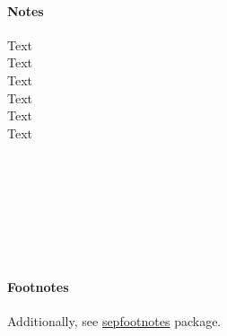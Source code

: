 \documentclass[itdr]{subfiles}
\begin{document}
\paragraph{Notes}
\vspace{-\baselineskip}
\begin{multicols}{2}
\noindent Text\note[1] \\
Text\note[2] \\
Text\note[3] \\
Text\note[4] \\
Text\note[5] \\
Text\note[6] 
\end{multicols}
\footnoterule\noindent
{} \\
 \\
 \\
 \\
 \\
 \\

\vspace{-2ex}
\paragraph{Footnotes}

\fbox{\lstinline!\\footnotemark[1]!} 

\noindent{}Additionally, see \href{https://www.ctan.org/pkg/sepfootnotes}{sepfootnotes} package.
\end{document}
